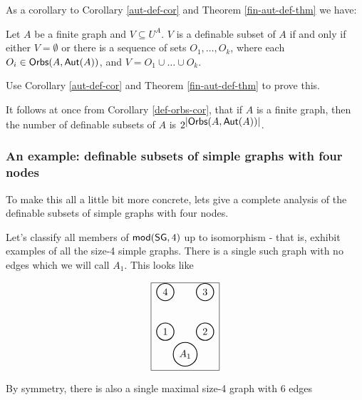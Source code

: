 As a corollary to Corollary \ref{aut-def-cor} and Theorem \ref{fin-aut-def-thm} we have:
\begin{corollary}\label{def-orbs-cor}
Let $A$ be a finite graph and $V\subseteq U^A$. $V$ is a definable subset of $A$ if and only if either $V=\emptyset$ or there is a sequence of sets $O_1, \ldots,O_k$, where each $O_i\in\mbox{$\mathsf{Orbs}(A,\mbox{$\mathsf{Aut}(A)$})$}$, and $V = O_1\cup\ldots\cup O_k$.
\end{corollary}

\begin{aside}
    Use Corollary \ref{aut-def-cor} and Theorem \ref{fin-aut-def-thm} to prove this. 
\end{aside}

It follows at once from Corollary \ref{def-orbs-cor}, that if $A$ is a finite graph, then the number of definable subsets of $A$ is $2^{\mbox{$|\mbox{$\mathsf{Orbs}(A,\mbox{$\mathsf{Aut}(A)$})$}|$}}$. 



\subsubsection*{An example: definable subsets of simple graphs with four nodes}

To make this all a little bit more concrete, lets give a complete analysis of the definable subsets of simple graphs with four nodes.

Let's classify all members of $\mbox{$\mathsf {mod}(\mbox{$\mathsf{SG}$},4)$}$ up to isomorphism - that is, exhibit examples of all the size-4 simple graphs. There is a single such graph with no edges which we will call $A_1$. This looks like

\[
    \begin{array}{|l|}
    \hline
    \begin{tikzpicture}
[scale=.2]
\begin{scope}[every node/.style={circle,thick,draw}]
    \node (1) at (0,4) {1};
    \node (2) at (7,4) {2};
    \node (3) at (7,11) {3};
    \node (4) at (0,11) {4};
   \node(A) at (3.5,0) {$A_1$};
\end{scope}
\end{tikzpicture}\\
\hline
\end{array}
\]

By symmetry, there is also a single maximal size-4 graph with 6 edges


